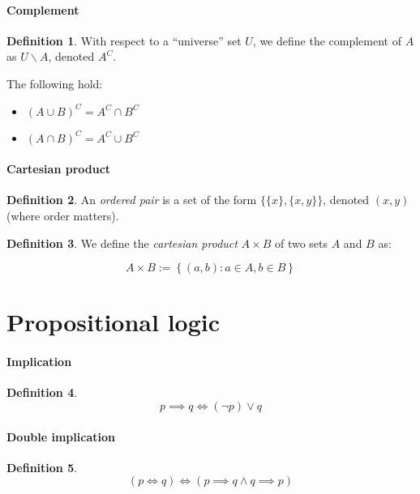 \documentclass[12pt,a4paper]{report}
\numberwithin{equation}{section}
\theoremstyle{definition}
\newtheorem{definition}{Definition}[section]
\theoremstyle{remark}
\begin{document}
\paragraph{Complement}

\begin{definition}
With respect to a ``universe'' set $U$, we define the complement of $A$ as $U \smallsetminus A$, denoted $A^C$.
\end{definition}

The following hold:

\begin{itemize}
\item $(A \cup B)^C = A^C \cap B^C$
\item $(A \cap B)^C = A^C \cup B^C$
\end{itemize}

\paragraph{Cartesian product}

\begin{definition}
An \emph{ordered pair} is a set of the form $\lbrace \lbrace x \rbrace , \lbrace x, y \rbrace \rbrace$, denoted $(x, y)$ (where order matters).
\end{definition}

\begin{definition}
We define the \emph{cartesian product} $A\times B$ of two sets $A$ and $B$ as:

\begin{equation}
A\times B := \left\lbrace (a, b) : a \in A, b \in B \right\rbrace
\end{equation}
\end{definition}

\section{Propositional logic}

\paragraph{Implication}
\begin{definition}
\begin{equation}
p\implies q \iff (\neg p ) \vee q
\end{equation}
\end{definition}

\paragraph{Double implication}
\begin{definition}
\begin{equation}
(p \iff q) \iff (p \implies q \wedge q \implies p )
\end{equation}
\end{definition}
\end{document}
